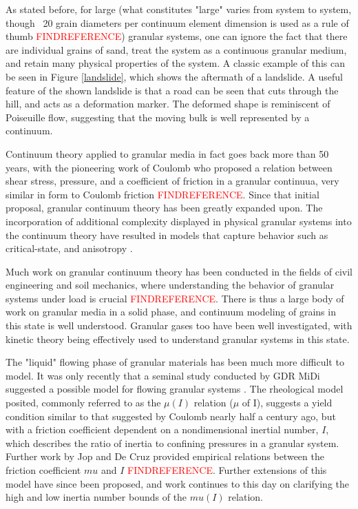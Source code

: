 As stated before, for large (what constitutes "large" varies from system to system, though ~20 grain diameters per continuum element dimension is used as a rule of thumb \textcolor{red}{FINDREFERENCE}) granular systems, one can ignore the fact that there are individual grains of sand, treat the system as a continuous granular medium, and retain many physical properties of the system. A classic example of this can be seen in Figure \ref{landslide}, which shows the aftermath of a landslide. A useful feature of the shown landslide is that a road can be seen that cuts through the hill, and acts as a deformation marker. The deformed shape is reminiscent of Poiseuille flow, suggesting that the moving bulk is well represented by a continuum.

Continuum theory applied to granular media in fact goes back more than 50 years, with the pioneering work of Coulomb who proposed a relation between shear stress, pressure, and a coefficient of friction in a granular continuua, very similar in form to Coulomb friction \textcolor{red}{FINDREFERENCE}. Since that initial proposal, granular continuum theory has been greatly expanded upon. The incorporation of additional complexity displayed in physical granular systems into the continuum theory have resulted in models that capture behavior such as critical-state, and anisotropy \cite{Schofield:1968:Critical}\cite{Dafalias:2004:Sand}.

Much work on granular continuum theory has been conducted in the fields of civil engineering and soil mechanics, where understanding the behavior of granular systems under load is crucial \textcolor{red}{FINDREFERENCE}. There is thus a large body of work on granular media in a solid phase, and continuum modeling of grains in this state is well understood. Granular gases too have been well investigated, with kinetic theory being effectively used to understand granular systems in this state.

The "liquid" flowing phase of granular materials has been much more difficult to model. It was only recently that a seminal study conducted by GDR MiDi suggested a possible model for flowing granular systems \cite{Midi:2004:Dense}. The rheological model posited, commonly referred to as the $\mu(I)$ relation ($\mu$ of I), suggests a yield condition similar to that suggested by Coulomb nearly half a century ago, but with a friction coefficient dependent on a nondimensional inertial number, $I$, which describes the ratio of inertia to confining pressures in a granular system. Further work by Jop and De Cruz provided empirical relations between the friction coefficient $mu$ and $I$ \cite{Jop:2006:Constitutive}\textcolor{red}{FINDREFERENCE}. Further extensions of this model have since been proposed, and work continues to this day on clarifying the high and low inertia number bounds of the $mu(I)$ relation. 


